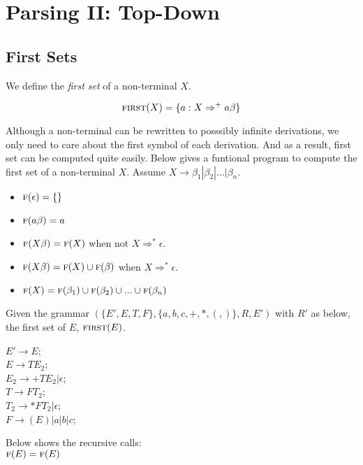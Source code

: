 
\chapter{Parsing II: Top-Down}


\section{First Sets}



We define the \textit{first set} of a non-terminal $X$. 

$$\textsc{first}(X) = \{a: X \Rightarrow^{+} a\beta \}$$

Although a non-terminal can be rewritten to posssibly infinite derivations, 
we only need to care about the first symbol of each derivation. And as a result, 
first set can be computed quite easily.
Below gives a funtional program to compute the first set of a non-terminal $X$.
Assume $X \rightarrow \beta_1 | \beta_2 | ... | \beta_n$. 

\begin{itemize}
\item $\textsc{f}(\epsilon) = \{\}$
\item $\textsc{f}(a\beta) = a$
\item $\textsc{f}(X\beta) = \textsc{f}(X)$ when not $X \Rightarrow^{*} \epsilon$. 
\item $\textsc{f}(X\beta) = \textsc{f}(X) \cup \textsc{f}(\beta)$ when $X \Rightarrow^{*} \epsilon$. 
\item $\textsc{f}(X) = \textsc{f}(\beta_1) \cup \textsc{f}(\beta_2) \cup ... \cup \textsc{f}(\beta_n)$
\end{itemize}

\frmrule 

\begin{example}
Given the grammar $(\{E',E,T,F\}, \{a,b,c,+,*,(,)\}, R, E')$ with $R'$ as below, 
the first set of $E$, $\textsc{first}(E)$.

$E' \rightarrow E$;\\
$E \rightarrow T E_2$;\\
$E_2 \rightarrow + T E_2 | \epsilon$;\\
$T \rightarrow F T_2$;\\
$T_2 \rightarrow * F T_2 | \epsilon$;\\
$F \rightarrow ( E ) | a | b | c$;

Below shows the recursive calls: \\
$\textsc{f}(E) = \textsc{f}(E) $


\end{example}


